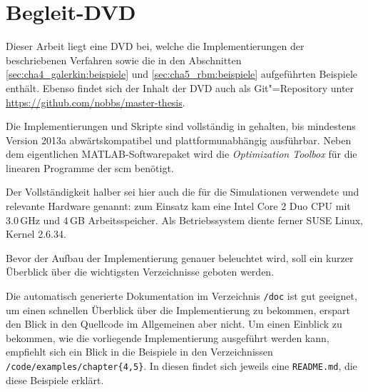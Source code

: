 \documentclass[../main.tex]{subfiles}
\begin{document}
\chapter{Begleit-DVD} %
\label{cha:inhalt_der_begleit_dvd}

Dieser Arbeit liegt eine DVD bei, welche die Implementierungen der beschriebenen Verfahren sowie die in den Abschnitten \ref{sec:cha4_galerkin:beispiele} und \ref{sec:cha5_rbm:beispiele} aufgeführten Beispiele enthält.
Ebenso findet sich der Inhalt der DVD auch als Git"=Repository unter \url{https://github.com/nobbs/master-thesis}.

Die Implementierungen und Skripte sind vollständig in \textcite{Matlab} gehalten, bis mindestens Version 2013a abwärtskompatibel und plattformunabhängig ausführbar.
Neben dem eigentlichen MATLAB-Softwarepaket wird die \emph{Optimization Toolbox} für die linearen Programme der \acl{scm} benötigt.

Der Vollständigkeit halber sei hier auch die für die Simulationen verwendete und relevante Hardware genannt:
zum Einsatz kam eine Intel Core 2 Duo CPU mit 3.0\,GHz und 4\,GB Arbeitsspeicher.
Als Betriebssystem diente ferner SUSE Linux, Kernel 2.6.34.

Bevor der Aufbau der Implementierung genauer beleuchtet wird, soll ein kurzer Überblick über die wichtigsten Verzeichnisse geboten werden.

\bigbreak
{}
\bigbreak

Die automatisch generierte Dokumentation im Verzeichnis \verb!/doc! ist gut geeignet, um einen schnellen Überblick über die Implementierung zu bekommen, erspart den Blick in den Quellcode im Allgemeinen aber nicht.
Um einen Einblick zu bekommen, wie die vorliegende Implementierung ausgeführt werden kann, empfiehlt sich ein Blick in die Beispiele in den Verzeichnissen \verb!/code/examples/chapter{4,5}!.
In diesen findet sich jeweils eine \verb!README.md!, die diese Beispiele erklärt.
\end{document}

